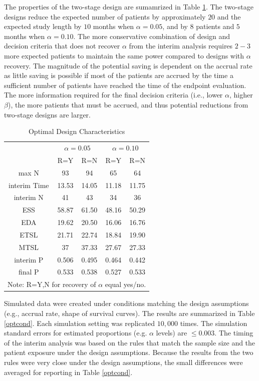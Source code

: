 \documentclass[12pt]{article}
\begin{document}
The properties of the two-stage design are sumamrized in Table
\ref{optchar}.  The two-stage designs reduce the expected number of patients by approximately $20$ and the expected
study length by $10$ months when $\alpha=0.05$, and by $8$ patients and $5$ months when
$\alpha=0.10$.  The more conservative combination of design and decision criteria that does not
recover $\alpha$ from the interim analysis requires $2-3$ more expected patients to maintain the same power compared to designs with
$\alpha$ recovery.  The magnitude of the potential saving is dependent on the accrual rate as
little saving is possible if most of the patients are accrued by the time a sufficient number of
patients have reached the time of the endpoint evaluation.  The more information required for the
final decision criteria (i.e., lower $\alpha$, higher $\beta$), the more patients that must be
accrued, and thus  potential reductions from two-stage designs are larger.



\begin{table}[h]
\caption{Optimal Design Characteristics}
\label{optchar}
 \begin{center}
 \begin{tabular}{c|cc|cc}\hline\hline
\vspace{-8pt}&\multicolumn{2}{c}{$\alpha=0.05$}\vrule&\multicolumn{2}{c}{$\alpha=0.10$}\\
&R=Y&R=N&R=Y&R=N\\
\hline
max N& 93&94&65&64\\
interim Time&13.53&14.05&11.18&11.75\\
interim N&41&43&34&36\\
ESS&58.87&61.50&48.16&50.29\\
EDA&19.62&20.50&16.06&16.76\\
ETSL&21.71&22.74&18.84&19.90\\
MTSL&37&37.33&27.67&27.33\\
interim P&0.506&0.495&0.464&0.442\\
final P&0.533&0.538&0.527&0.533\\
\hline \hline\hline \multicolumn{5}{l}{Note:  R=Y,N for recovery of $\alpha$ equal yes/no.}
\end{tabular}
\end{center}
\end{table}

Simulated data were created under conditions matching the design assumptions (e.g., accrual rate,
shape of survival curves).  The results are summarized in Table \ref{optcond}.  Each simulation
setting was replicated $10,000$ times.  The simulation standard errors for estimated proportions
(e.g. $\alpha$ levels) are $\leq 0.003$. The timing of the interim analysis was based on the rules
that match the sample size and the patient exposure under the design assumptions.  Because the
results from the two rules were very close under the design assumptions, the small differences were
averaged for reporting in Table \ref{optcond}.
\end{document}
